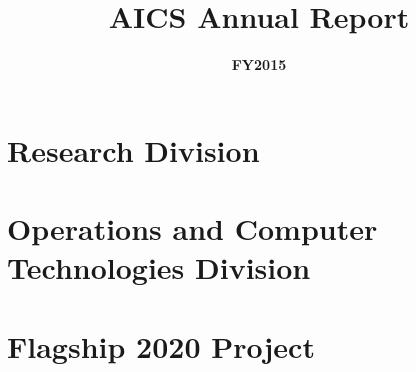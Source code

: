 \documentclass[a4paper,oneside]{book}
\begin{document}
\title{\Huge \bf AICS Annual Report}

\date{\Huge \bf FY2015}

\maketitle

\renewcommand{\thepage}{\roman{page}}


%


\tableofcontents

\clearpage
\setcounter{page}{1}
\renewcommand{\thepage}{\arabic{page}}

%

\part{Research Division}




%

















\part{Operations and Computer Technologies Division}







\part{Flagship 2020 Project}

%

%
%
%
\end{document}
